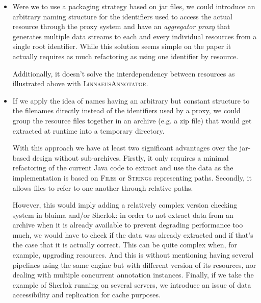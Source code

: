 \documentclass{article}
\newcommand{\ID}[1]{{\textsc{#1}}}
\begin{document}
\begin{itemize}

    \item Were we to use a packaging strategy based on jar files, we could introduce an arbitrary
        naming structure for the identifiers used to access the actual resource through the proxy
        system and have an \emph{aggregator proxy} that generates multiple data streams to each and
        every individual resources from a single root identifier. While this solution seems simple
        on the paper it actually requires as much refactoring as using one identifier by resource.

        Additionally, it doesn't solve the interdependency between resources as illustrated above
        with \ID{LinnaeusAnnotator}.

    \item If we apply the idea of names having an arbitrary but constant structure to the filenames
        directly instead of the identifiers used by a proxy, we could group the resource files
        together in an archive (e.g. a zip file) that would get extracted at runtime into a
        temporary directory.

        With this approach we have at least two significant advantages over the jar-based design
        without sub-archives. Firstly, it only requires a minimal refactoring of the current Java
        code to extract and use the data as the implementation is based on \ID{File}s or
        \ID{String}s representing paths. Secondly, it allows files to refer to one another through
        relative paths.

        However, this would imply adding a relatively complex version checking system in bluima
        and/or Sherlok: in order to not extract data from an archive when it is already available to
        prevent degrading performance too much, we would have to check if the data was already
        extracted and if that's the case that it is actually correct. This can be quite complex
        when, for example, upgrading resources. And this is without mentioning having several
        pipelines using the same engine but with different version of its resources, nor dealing
        with multiple concurrent annotation instances. Finally, if we take the example of Sherlok
        running on several servers, we introduce an issue of data accessibility and replication for
        cache purposes.

\end{itemize}
\end{document}
